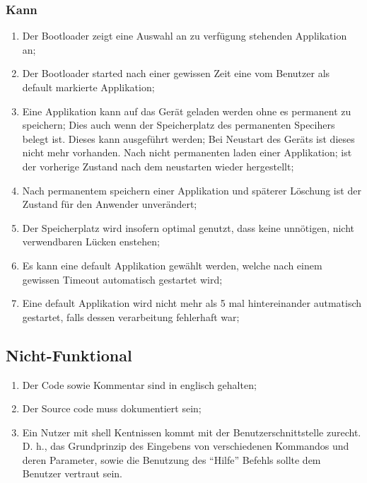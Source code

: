 \documentclass[letterpaper,10pt,ngerman]{manual}
\begin{document}
\subsubsection{Kann}
\begin{enumerate}
\item {} 
Der Bootloader zeigt eine Auswahl an zu verfügung stehenden Applikation an;

\item {} 
Der Bootloader started nach einer gewissen Zeit eine vom Benutzer als default markierte Applikation;

\item {} 
Eine Applikation kann auf das Gerät geladen werden ohne es permanent zu speichern;
Dies auch wenn der Speicherplatz des permanenten Specihers belegt ist. Dieses kann ausgeführt werden;
Bei Neustart des Geräts ist dieses nicht mehr vorhanden. Nach nicht permanenten laden einer Applikation;
ist der vorherige Zustand nach dem neustarten wieder hergestellt;

\item {} 
Nach permanentem speichern einer Applikation und späterer Löschung ist der Zustand für den Anwender unverändert;

\item {} 
Der Speicherplatz wird insofern optimal genutzt, dass keine unnötigen, nicht verwendbaren Lücken enstehen;

\item {} 
Es kann eine default Applikation gewählt werden, welche nach einem gewissen Timeout automatisch gestartet wird;

\item {} 
Eine default Applikation wird nicht mehr als 5 mal hintereinander autmatisch gestartet, falls dessen verarbeitung fehlerhaft war;

\end{enumerate}


\subsection{Nicht-Funktional}
\begin{enumerate}
\item {} 
Der Code sowie Kommentar sind in englisch gehalten;

\item {} 
Der Source code muss dokumentiert sein;

\item {} 
Ein Nutzer mit shell Kentnissen kommt mit der Benutzerschnittstelle zurecht. D. h., das Grundprinzip des Eingebens
von verschiedenen Kommandos und deren Parameter, sowie die Benutzung des ``Hilfe'' Befehls sollte dem Benutzer vertraut sein.

\end{enumerate}
\end{document}
